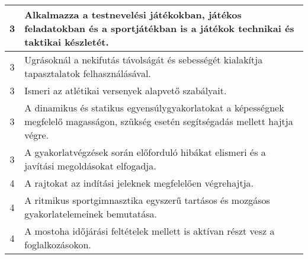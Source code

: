 \begin{longtable}{c | p{} }
                                
                                          3 &  Alkalmazza a testnevelési játékokban, játékos feladatokban és a sportjátékban is a játékok technikai és taktikai készletét. \\ \hline
                                          3 &  Ugrásoknál a nekifutás távolságát és sebességét kialakítja tapasztalatok felhasználásával. \\ \hline
                                          3 &  Ismeri az atlétikai versenyek alapvető szabályait. \\ \hline
                                          3 &  A dinamikus és statikus egyensúlygyakorlatokat a képességnek megfelelő magasságon, szükség esetén segítségadás mellett hajtja végre. \\ \hline
                                          3 &  A gyakorlatvégzések során előforduló hibákat elismeri és a javítási megoldásokat elfogadja. \\ \hline
                                      
                                
                                          4 &  A rajtokat az indítási jeleknek megfelelően végrehajtja. \\ \hline
                                          4 &  A ritmikus sportgimnasztika egyszerű tartásos és mozgásos gyakorlatelemeinek bemutatása. \\ \hline
                                          4 &  A mostoha időjárási feltételek mellett is aktívan részt vesz a foglalkozásokon. \\ \hline
                                      
                        \end{longtable}
            \clearpage

